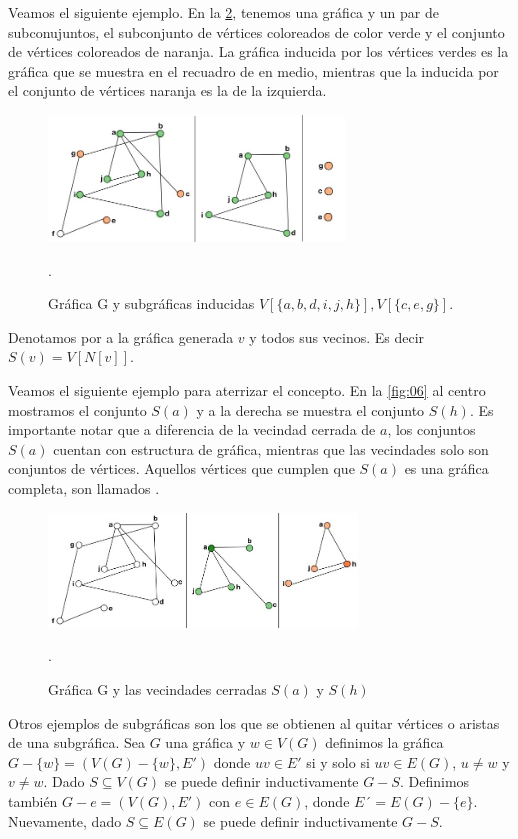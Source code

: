 Veamos el siguiente ejemplo.
En la \cref{fig:05}, tenemos una gráfica y un par de subconujuntos, el subconjunto de vértices coloreados de color verde y el conjunto de vértices coloreados de naranja. La gráfica inducida por los vértices verdes es la gráfica que se muestra en el recuadro de en medio, mientras que la inducida por el conjunto de vértices naranja es la de la izquierda.

\begin{figure}[H]
  \centering
  \includegraphics[width=0.7\textwidth]{recursos/capturas/09.jpg}
  \caption{Gráfica G y subgráficas inducidas $V[\{ a,b,d,i,j,h\}], V[\{ c,e,g\}]$.}.
  \label{fig:04}
\end{figure}

Denotamos por  a la gráfica generada $v$ y todos sus vecinos. Es decir $S(v)=V[N[v]]$.

Veamos el siguiente ejemplo para aterrizar el concepto.
En la \cref{fig:06} al centro mostramos el conjunto $S(a)$ y a la derecha se muestra el conjunto $S(h)$.
Es importante notar que a diferencia de la vecindad cerrada de $a$, los conjuntos $S(a)$ cuentan con estructura de gráfica, mientras que las vecindades solo son conjuntos de vértices. Aquellos vértices que cumplen que $S(a)$ es una gráfica completa, son llamados .

\begin{figure}[H]
  \centering
  \includegraphics[width=0.73\textwidth]{recursos/capturas/10.jpg}
  \caption{Gráfica G y las vecindades cerradas $S(a)$ y $S(h)$}.
  \label{fig:05}
\end{figure}

Otros ejemplos de subgráficas son los que se obtienen al quitar vértices o aristas de una subgráfica. Sea $G$ una gráfica y $w\in V(G)$ definimos la gráfica $G-\{w\}=(V(G)-\{w\}, E')$ donde $uv\in E'$ si y solo si $uv\in E(G)$, $u\neq w$ y $v\neq w$. Dado $S\subseteq V(G)$ se puede definir inductivamente $G-S$.
Definimos también $G-{e}=(V(G),E')$ con $e\in E(G)$, donde $E´=E(G)-\{e\}$. Nuevamente, dado $S\subseteq E(G)$ se puede definir inductivamente $G-S$.


